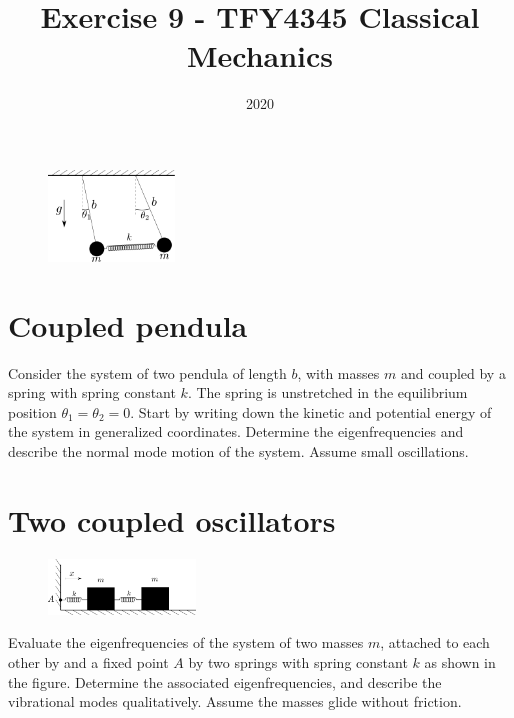 \documentclass{article}
\title{Exercise 9 - TFY4345 Classical Mechanics}
\date{2020}
\begin{document}
    \maketitle
    \begin{figure}
        \vspace{-0.5cm}
        \includegraphics[width=0.3\textwidth]{figures/figure_1.pdf}
        \vspace*{-2.1cm}
    \end{figure}
    \section{Coupled pendula}
    Consider the system of two pendula of length $b$, with masses $m$ and coupled by a spring with spring constant $k$. The spring is unstretched in the equilibrium position $\theta_1 = \theta_2 = 0$. Start by writing down the kinetic and potential energy of the system in generalized coordinates. Determine the eigenfrequencies and describe the normal mode motion of the system. Assume small oscillations.

    \section{Two coupled oscillators}
    \begin{figure}
        \vspace{-0.5cm}
        \includegraphics[width=0.35\textwidth]{figures/figure_2.pdf}
        \vspace*{-1.5cm}
    \end{figure}
    Evaluate the eigenfrequencies of the system of two masses $m$, attached to each other by and a fixed point $A$ by two springs with spring constant $k$ as shown in the figure. Determine the associated eigenfrequencies, and describe the vibrational modes qualitatively. Assume the masses glide without friction.
\end{document}
